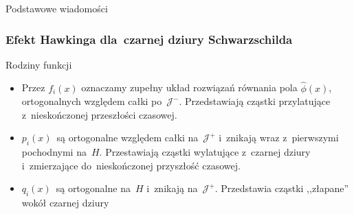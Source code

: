 \documentclass[10pt,t]{beamer}
\begin{document}
\begin{frame}{Podstawowe wiadomości}
  \frametitle{Efekt Hawkinga dla~czarnej dziury Schwarzschilda}


  Rodziny funkcji
  \begin{itemize}
    \RaggedRight

  \item Przez $f_{ i }( x )$ oznaczamy zupełny układ rozwiązań
    równania pola $\widehat{ \phi }( x )$, ortogonalnych względem
    całki po~$\mathcal{J}^{ - }$. Przedstawiają cząstki przylatujące
    z~nieskończonej przeszłości czasowej.

  \item $p_{ i }( x )$~są ortogonalne względem całki
    na~$\mathcal{J}^{ + }$ i~znikają wraz z~pierwszymi pochodnymi
    na~$H$. Przestawiają cząstki wylatujące z~czarnej dziury
    i~zmierzające do~nieskończonej przyszłość czasowej.

  \item $q_{ i }( x )$~są ortogonalne na~$H$ i~znikają
    na~$\mathcal{J}^{ + }$. Przedstawia cząstki ,,złapane'' wokół
    czarnej dziury

  \end{itemize}

\end{frame}






\end{document}
